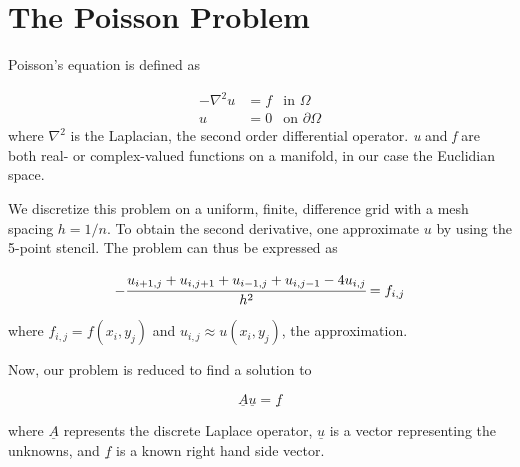 \section{The Poisson Problem}

Poisson's equation is defined as

\begin{align}
  - \nabla ^2 u &= f &\text{in~} \Omega \\
  u &= 0 &\text{on~} \partial\Omega
\end{align}
where $\nabla^2$ is the Laplacian, the second order differential
operator. {\em u} and {\em f} are both real- or complex-valued functions on a
manifold, in our case the Euclidian space.

We discretize this problem on a uniform, finite, difference grid with a mesh
spacing $h = 1/n$. To obtain the second derivative, one approximate $u$ by using
the 5-point stencil. The problem can thus be expressed as

\begin{equation}
  -\cfrac{u_{i+1, j} + u_{i, j+1} +u_{i-1, j} +u_{i, j-1} - 4u_{i, j}}{h^2} =
  f_{i,j}
\end{equation}

where $f_{i,j} = f(x_i, y_j)$ and $u_{i,j} \approx u(x_i, y_j)$, the
approximation.

Now, our problem is reduced to find a solution to

\begin{equation}
  \underline A \underline u = \underline f
\end{equation}

where $\underline A$ represents the discrete Laplace operator, $\underline u$ is
a vector representing the unknowns, and $\underline f$ is a known right hand
side vector.


